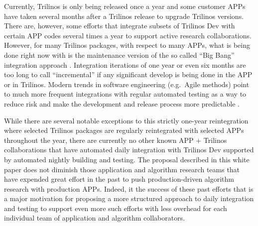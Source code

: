 \documentclass[pdf,ps2pdf,11pt]{SANDreport}
\begin{document}
Currently, Trilinos is only being released once a year and some customer APPs
have taken several months after a Trilinos release to upgrade Trilinos
versions.  There are, however, some efforts that integrate subsets of Trilinos
Dev with certain APP codes several times a year to support active research
collaborations.  However, for many Trilinos packages, with respect to many
APPs, what is being done right now with is the maintenance version of the so
called ``Big Bang'' integration approach {}\cite{book:code-complete-2}.
Integration iterations of one year or even six months are too long to call
``incremental'' if any significant develop is being done in the APP or in
Trilinos.  Modern trends in software engineering (e.g.\ Agile methods) point
to much more frequent integrations with regular automated testing as a way to
reduce risk and make the development and release process more predictable
{}\cite{book:code-complete-2, book:continuous-integration,
book:extreme-programming-2nd, book:agile-software-development,
book:crystal-clear}.

While there are several notable exceptions to this strictly one-year
reintegration where selected Trilinos packages are regularly reintegrated with
selected APPs throughout the year, there are currently no other known APP +
Trilinos collaborations that have automated daily integration with Trilinos
Dev supported by automated nightly building and testing.  The proposal
described in this white paper does not diminish those application and
algorithm research teams that have expended great effort in the past to push
production-driven algorithm research with production APPs.  Indeed, it the
success of these past efforts that is a major motivation for proposing a more
structured approach to daily integration and testing to support even more such
efforts with less overhead for each individual team of application and
algorithm collaborators.
\end{document}
